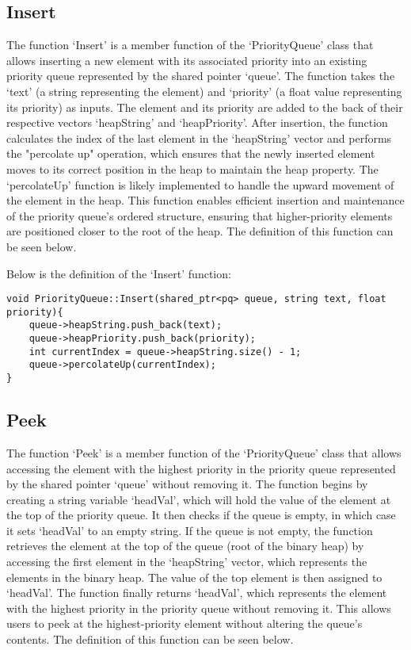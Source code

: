 \subsection*{Insert}

The function `Insert' is a member function of the `PriorityQueue' class that allows inserting a new element with its associated priority into an existing priority queue represented by the shared pointer `queue'. 
The function takes the `text' (a string representing the element) and `priority' (a float value representing its priority) as inputs. The element and its priority are added to the back of their respective vectors 
`heapString' and `heapPriority'. After insertion, the function calculates the index of the last element in the `heapString' vector and performs the "percolate up" operation, which ensures that the newly inserted 
element moves to its correct position in the heap to maintain the heap property. The `percolateUp' function is likely implemented to handle the upward movement of the element in the heap. This function enables 
efficient insertion and maintenance of the priority queue's ordered structure, ensuring that higher-priority elements are positioned closer to the root of the heap. The definition of this function can be seen
below.

\begin{highlight}

Below is the definition of the `Insert' function:

\horizontalline 

\begin{verbatim}
void PriorityQueue::Insert(shared_ptr<pq> queue, string text, float priority){
    queue->heapString.push_back(text);
    queue->heapPriority.push_back(priority);
    int currentIndex = queue->heapString.size() - 1;
    queue->percolateUp(currentIndex);
}
\end{verbatim}

\end{highlight}

\subsection*{Peek}

The function `Peek' is a member function of the `PriorityQueue' class that allows accessing the element with the highest priority in the priority queue represented by the shared pointer `queue' without removing it. 
The function begins by creating a string variable `headVal', which will hold the value of the element at the top of the priority queue. It then checks if the queue is empty, in which case it sets `headVal' to an empty 
string. If the queue is not empty, the function retrieves the element at the top of the queue (root of the binary heap) by accessing the first element in the `heapString' vector, which represents the elements in the 
binary heap. The value of the top element is then assigned to `headVal'. The function finally returns `headVal', which represents the element with the highest priority in the priority queue without removing it. This 
allows users to peek at the highest-priority element without altering the queue's contents. The definition of this function can be seen below.

